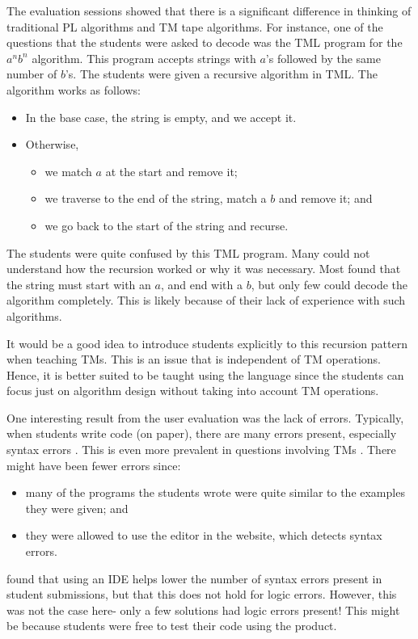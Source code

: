 The evaluation sessions showed that there is a significant difference in thinking of traditional PL algorithms and TM tape algorithms. For instance, one of the questions that the students were asked to decode was the TML program for the $a^n b^n$ algorithm. This program accepts strings with $a$'s followed by the same number of $b$'s. The students were given a recursive algorithm in TML. The algorithm works as follows:
\begin{itemize}
    \item In the base case, the string is empty, and we accept it.
    \item Otherwise, 
    \begin{itemize}
        \item we match $a$ at the start and remove it;
        \item we traverse to the end of the string, match a $b$ and remove it; and
        \item we go back to the start of the string and recurse.
    \end{itemize}
\end{itemize}
The students were quite confused by this TML program. Many could not understand how the recursion worked or why it was necessary. Most found that the string must start with an $a$, and end with a $b$, but only few could decode the algorithm completely. This is likely because of their lack of experience with such algorithms. 

It would be a good idea to introduce students explicitly to this recursion pattern when teaching TMs. This is an issue that is independent of TM operations. Hence, it is better suited to be taught using the language since the students can focus just on algorithm design without taking into account TM operations.

One interesting result from the user evaluation was the lack of errors. Typically, when students write code (on paper), there are many errors present, especially syntax errors \citep{corley2020paper}. This is even more prevalent in questions involving TMs \citep{rodger2006jflap}. There might have been fewer errors since:
\begin{itemize}
    \item many of the programs the students wrote were quite similar to the examples they were given; and
    \item they were allowed to use the editor in the website, which detects syntax errors.
\end{itemize}
\citet{corley2020paper} found that using an IDE helps lower the number of syntax errors present in student submissions, but that this does not hold for logic errors. However, this was not the case here- only a few solutions had logic errors present! This might be because students were free to test their code using the product.


